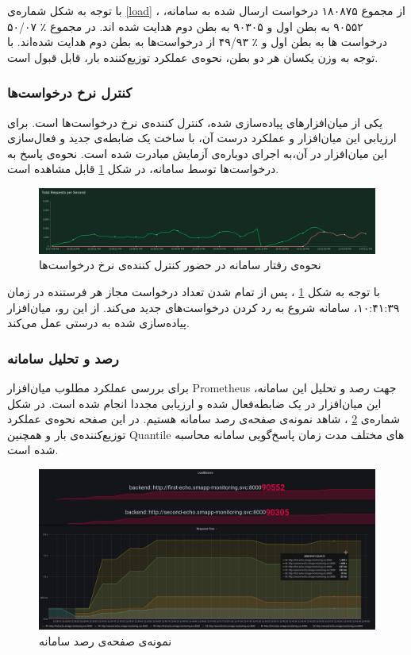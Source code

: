 با توجه به شکل شماره‌ی
\ref{load}
، از مجموع ۱۸۰۸۷۵ درخواست ارسال شده به سامانه، ۹۰۵۵۲ به بطن اول و ۹۰۳۰۵ به بطن دوم هدایت شده اند. در مجموع ٪ ۵۰/۰۷ درخواست ها به بطن اول و ٪ ۴۹/۹۳ از درخواست‌ها به بطن دوم هدایت شده‌اند. با توجه به وزن یکسان هر دو بطن، نحوه‌ی عملکرد توزیع‌کننده بار، قابل قبول است.


\subsubsection{کنترل نرخ درخواست‌ها}
یکی از میان‌افزار‌های پیاده‌سازی شده، کنترل کننده‌ی نرخ درخواست‌ها است. برای ارزیابی این میان‌افزار و عملکرد درست آن، با ساخت یک ضابطه‌ی جدید و فعال‌سازی این میان‌افزار در آن،‌به اجرای دوباره‌ی آزمایش مبادرت شده است. نحوه‌ی پاسخ به درخواست‌ها توسط سامانه، در شکل
\ref{rate}
قابل مشاهده است.

\begin{figure}[H]
    \centering
    \label{rate}
    \includegraphics[scale=0.23]{images/RatelimitStats.png}
    \caption{نحوه‌ی رفتار سامانه در حضور کنترل کننده‌ی نرخ درخواست‌ها}
\end{figure}

با توجه به شکل
\ref{rate}
،‌ پس از تمام شدن تعداد درخواست مجاز هر فرستنده در زمان ۱۰:۴۱:۳۹، سامانه شروع به رد کردن درخواست‌های جدید می‌کند. از این رو، میان‌افزار پیاده‌سازی شده به درستی عمل می‌کند.

\subsubsection{رصد و تحلیل سامانه}
برای بررسی عملکرد مطلوب میان‌افزار Prometheus جهت رصد و تحلیل این سامانه، این میان‌افزار در یک ضابطه‌فعال شده و ارزیابی مجددا انجام شده است. در شکل شماره‌ی
\ref{monitoring}
، شاهد نمونه‌ی صفحه‌ی رصد سامانه هستیم. در این صفحه نحوه‌ی عملکرد توزیع‌کننده‌ی بار و همچنین Quantile های مختلف مدت زمان پاسخ‌گویی سامانه محاسبه شده است.

\begin{figure}[H]
    \centering
    \label{monitoring}
    \includegraphics[scale=0.23]{images/Stats.png}
    \caption{نمونه‌ی صفحه‌ی رصد سامانه}
\end{figure}


\cleardoublepage 